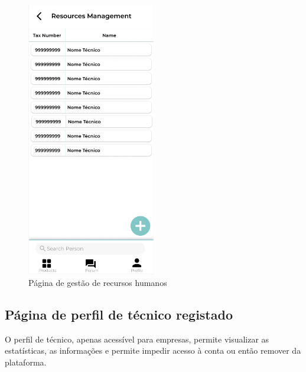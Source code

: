 \begin{figure}[htb]
    \centering
    \includegraphics[width=0.5\textwidth]{images/mockups/human_resources.png}
    \caption{Página de gestão de recursos humanos}
    \label{fig:31}
\end{figure}

\newpage

\subsection{Página de perfil de técnico registado}

O perfil de técnico, apenas acessível para empresas, permite visualizar as estatísticas, as informações e permite impedir acesso à conta ou então remover da plataforma.

